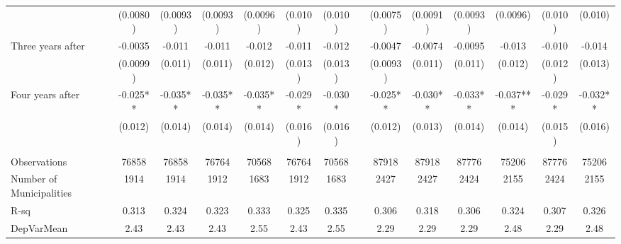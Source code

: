 \begin{tabular}{lccccccccccccc}
      & (0.0080) & (0.0093) & (0.0093) & (0.0096) & (0.010) & (0.010) &       & (0.0075) & (0.0091) & (0.0093) & (0.0096) & (0.010) & (0.010) \\
Three years after & -0.0035 & -0.011 & -0.011 & -0.012 & -0.011 & -0.012 &       & -0.0047 & -0.0074 & -0.0095 & -0.013 & -0.010 & -0.014 \\
      & (0.0099) & (0.011) & (0.011) & (0.012) & (0.013) & (0.013) &       & (0.0093) & (0.011) & (0.011) & (0.012) & (0.012) & (0.013) \\
Four years after & -0.025** & -0.035** & -0.035** & -0.035** & -0.029* & -0.030* &       & -0.025** & -0.030** & -0.033** & -0.037*** & -0.029* & -0.032** \\
      & (0.012) & (0.014) & (0.014) & (0.014) & (0.016) & (0.016) &       & (0.012) & (0.013) & (0.014) & (0.014) & (0.015) & (0.016) \\
      &       &       &       &       &       &       &       &       &       &       &       &       &  \\
\midrule
Observations & 76858 & 76858 & 76764 & 70568 & 76764 & 70568 &       & 87918 & 87918 & 87776 & 75206 & 87776 & 75206 \\
Number of Municipalities & 1914  & 1914  & 1912  & 1683  & 1912  & 1683  &       & 2427  & 2427  & 2424  & 2155  & 2424  & 2155 \\
R-sq  & 0.313 & 0.324 & 0.323 & 0.333 & 0.325 & 0.335 &       & 0.306 & 0.318 & 0.306 & 0.324 & 0.307 & 0.326 \\
DepVarMean & 2.43  & 2.43  & 2.43  & 2.55  & 2.43  & 2.55  &       & 2.29  & 2.29  & 2.29  & 2.48  & 2.29  & 2.48 \\
\bottomrule
\bottomrule
\end{tabular}%
